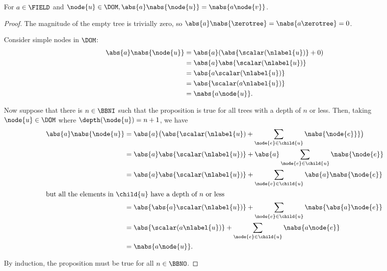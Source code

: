 \begin{proposition}\label{absolutehomogeneity}
  For $a \in \FIELD$ and $\node{u} \in \DOM, \abs{a}\nabs{\node{u}} =
  \nabs{a \node{v}}$.
  \begin{proof}
    The magnitude of the empty tree is trivially zero, so $\abs{a}\nabs{\zerotree} =
    \nabs{a\zerotree} = 0$.

    Consider simple nodes in $\DOM$:
    \begin{align*}
      \abs{a}\nabs{\node{u}} &= \abs{a}(\abs{\scalar(\nlabel{u})} + 0) \\
      &= \abs{a}\abs{\scalar(\nlabel{u})} \\
      &= \abs{a\scalar(\nlabel{u})} \\
      &= \abs{\scalar(a\nlabel{u})} \\
      &= \nabs{a \node{u}}.
    \end{align*}

    Now suppose that there is $n \in \BBNI$ such that the proposition is true for
    all trees with a depth of $n$ or less. Then, taking $\node{u} \in
    \DOM$ where $\depth(\node{u}) = n+1$, we have
    \begin{align*}
      \abs{a}\nabs{\node{u}} &= \abs{a}\bigl(\abs{\scalar(\nlabel{u}) + \sum_{\node{e}\in\child{u}}\nabs{\node{e}}}\bigr) \\
      &= \abs{a}\abs{\scalar(\nlabel{u})} + \abs{a}\sum_{\node{e}\in\child{u}}\nabs{\node{e}}\\
      &= \abs{a}\abs{\scalar(\nlabel{u})} + \sum_{\node{e}\in\child{u}}\abs{a}\nabs{\node{e}}\\
      \intertext{but all the elements in $\child{u}$ have a depth of $n$ or less}
      &= \abs{\abs{a}\scalar(\nlabel{u})} + \sum_{\node{e}\in\child{u}}\nabs{\abs{a}\node{e}} \\
      &= \abs{\scalar(a\nlabel{u})} + \sum_{\node{e}\in\child{u}}\nabs{a \node{e}} \\
      &= \nabs{a \node{u}}.
    \end{align*}

    By induction, the proposition must be true for all $n \in \BBNO$.
  \end{proof}
\end{proposition}

